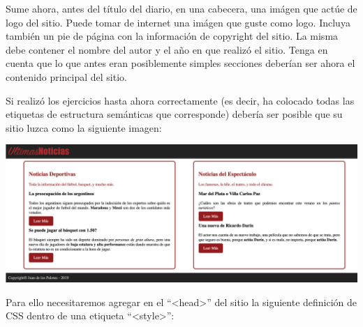 \begin{exercise}
Sume ahora, antes del título del diario, en una cabecera, una imágen que
actúe de logo del sitio. Puede tomar de internet una imágen que guste
como logo. Incluya también un pie de página con la información de copyright
del sitio. La misma debe contener el nombre del autor y el año en que
realizó el sitio. Tenga en cuenta que lo que antes eran posiblemente
simples secciones deberían ser ahora el contenido principal del sitio.
\end{exercise}

\begin{exercise}
Si realizó los ejercicios hasta ahora correctamente (es decir, ha colocado
todas las etiquetas de estructura semánticas que corresponde) debería ser
posible que su sitio luzca como la siguiente imagen:

\includegraphics[scale=0.3]{apendices/html/imagenes/diario_4.png}

Para ello necesitaremos agregar en el ``<head>'' del sitio la siguiente
definición de CSS dentro de una etiqueta ``<style>'':


\end{exercise}
